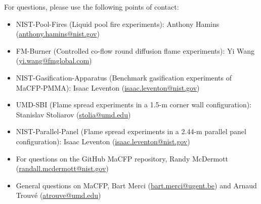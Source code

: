\documentclass[12pt]{article}
\begin{document}
For questions, please use the following points of contact:
\begin{itemize}[noitemsep]
 \item NIST-Pool-Fires (Liquid pool fire experiments): Anthony Hamins (\href{mailto:anthony.hamins@nist.gov}{anthony.hamins@nist.gov})
 \item FM-Burner (Controlled co-flow round diffusion flame experiments): Yi Wang (\href{mailto:yi.wang@fmglobal.com}{yi.wang@fmglobal.com})
 \item NIST-Gasification-Apparatus (Benchmark gasification experiments of MaCFP-PMMA): Isaac Leventon (\href{mailto:isaac.leventon@nist.gov}{isaac.leventon@nist.gov})
 \item UMD-SBI (Flame spread experiments in a 1.5-m corner wall configuration): Stanislav Stoliarov (\href{mailto:stolia@umd.edu}{stolia@umd.edu})
 \item NIST-Parallel-Panel (Flame spread experiments in a 2.44-m parallel panel configuration): Isaac Leventon (\href{mailto:isaac.leventon@nist.gov}{isaac.leventon@nist.gov})
 \item For questions on the GitHub MaCFP repository, Randy McDermott (\href{mailto:randall.mcdermott@nist.gov}{randall.mcdermott@nist.gov})
 \item General questions on MaCFP, Bart Merci (\href{mailto:bart.merci@ugent.be}{bart.merci@ugent.be}) and Arnaud Trouv\'e (\href{mailto:atrouve@umd.edu}{atrouve@umd.edu})
\end{itemize}
 

\end{document}
